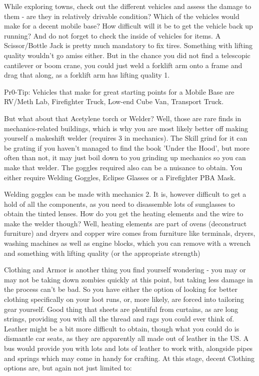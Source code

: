 While exploring towns, check out the different vehicles and assess the damage to them - are they in relatively drivable condition? Which of the vehicles would make for a decent mobile base? How difficult will it be to get the vehicle back up running? And do not forget to check the inside of vehicles for items. A Scissor/Bottle Jack is pretty much mandatory to fix tires. Something with lifting quality wouldn't go amiss either. But in the chance you did not find a telescopic cantilever or boom crane, you could just weld a forklift arm onto a frame and drag that along, as a forklift arm has lifting quality 1.

Pr0-Tip: Vehicles that make for great starting points for a Mobile Base are RV/Meth Lab, Firefighter Truck, Low-end Cube Van, Transport Truck.

But what about that Acetylene torch or Welder? Well, those are rare finds in mechanics-related buildings, which is why you are most likely better off making yourself a makeshift welder (requires 3 in mechanics). The Skill grind for it can be grating if you haven't managed to find the book 'Under the Hood', but more often than not, it may just boil down to you grinding up mechanics so you can make that welder. The goggles required also can be a nuisance to obtain. You either require Welding Goggles, Eclipse Glasses or a Firefighter PBA Mask.

Welding goggles can be made with mechanics 2. It is, however difficult to get a hold of all the components, as you need to disassemble lots of sunglasses to obtain the tinted lenses. How do you get the heating elements and the wire to make the welder though? Well, heating elements are part of ovens (deconstruct furniture) and dryers and copper wire comes from furniture like terminals, dryers, washing machines as well as engine blocks, which you can remove with a wrench and something with lifting quality (or the appropriate strength)

Clothing and Armor is another thing you find yourself wondering - you may or may not be taking down zombies quickly at this point, but taking less damage in the process can't be bad. So you have either the option of looking for better clothing specifically on your loot runs, or, more likely, are forced into tailoring gear yourself. Good thing that sheets are plentiful from curtains, as are long strings, providing you with all the thread and rags you could ever think of. Leather might be a bit more difficult to obtain, though what you could do is dismantle car seats, as they are apparently all made out of leather in the US. A bus would provide you with lots and lots of leather to work with, alongside pipes and springs which may come in handy for crafting. At this stage, decent Clothing options are, but again not just limited to:

